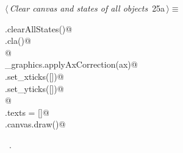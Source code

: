 \documentclass[11.5pt]{report}
\begin{document}
\vspace{-0.8cm}\newchunk 

\begin{flushleft} \small\label{scrap19}\raggedright\small
{} $\langle\,${\itshape Clear canvas and states of all objects}\nobreak\ {\footnotesize {25a}}$\,\rangle\equiv$
\vspace{-1ex}
\begin{list}{}{} \item
\mbox{}\verb@run.clearAllStates()@\\
\mbox{}\verb@ax.cla()@\\
\mbox{}\verb@              @\\
\mbox{}\verb@utils_graphics.applyAxCorrection(ax)@\\
\mbox{}\verb@ax.set_xticks([])@\\
\mbox{}\verb@ax.set_yticks([])@\\
\mbox{}\verb@                 @\\
\mbox{}\verb@fig.texts = []@\\
\mbox{}\verb@fig.canvas.draw()@\\
\mbox{}\verb@@{\NWsep}
\end{list}
\vspace{-1.5ex}
\footnotesize
\begin{list}{}{\setlength{\itemsep}{-\parsep}\setlength{\itemindent}{-\leftmargin}}
\item \NWtxtMacroRefIn\ .

\item{}
\end{list}
\vspace{4ex}
\end{flushleft}
\vspace{-0.8cm}\newchunk 
\end{document}
